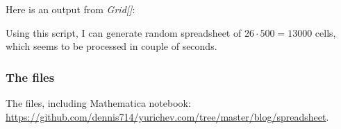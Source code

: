 Here is an output from \textit{Grid[]}:



Using this script, I can generate random spreadsheet of $26 \cdot 500=13000$ cells,
which seems to be processed in couple of seconds.

\subsubsection{The files}

The files, including Mathematica notebook: \url{https://github.com/dennis714/yurichev.com/tree/master/blog/spreadsheet}.

